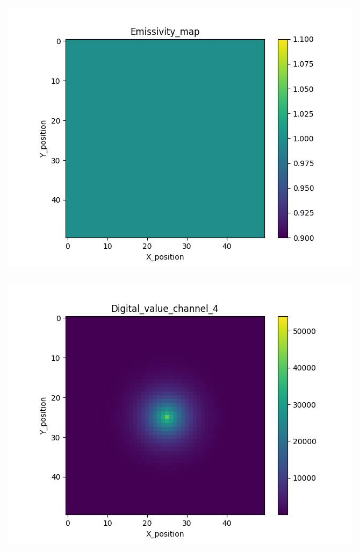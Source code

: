 {\linespread{1}
\begin{figure}[htbp]
    \centering
    \begin{minipage}{\textwidth}
        \centering
        \begin{subfigure}{0.45\textwidth}
            \includegraphics[width=\textwidth]{figures/raw_data/0/emi_field.jpg}
        \end{subfigure}
        \begin{subfigure}{0.45\textwidth}
            \centering
            \includegraphics[width=\textwidth]{figures/raw_data/0/digital_value_channel_4.jpg}
        \end{subfigure}
        \label{fig: raw_data_0}

\end{minipage}
\end{figure}}
